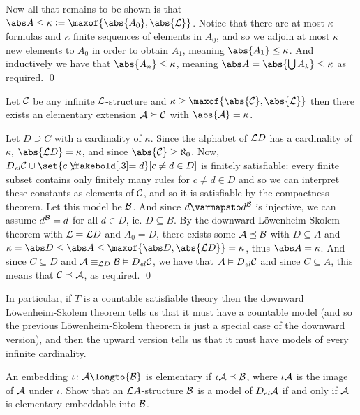Now all that remains to be shown is that $\abs A\leq\kappa\coloneqq\maxof{\abs{A_0},\abs{{\cal L}}}$.
Notice that there are at most $\kappa$ formulas and $\kappa$ finite sequences of elements in $A_0$, and so we adjoin at most $\kappa$ new elements to $A_0$ in order to obtain $A_1$, meaning
$\abs{A_1}\leq\kappa$.
And inductively we have that $\abs{A_n}\leq\kappa$, meaning $\abs A=\abs{\bigcup A_k}\leq\kappa$ as required.
\qed

\bthrm[title=Upward L\"owenheim-Skolem Theorem, name=uplowskol]

    Let ${\cal C}$ be any infinite ${\cal L}$-structure and $\kappa\geq\maxof{\abs{{\cal C}},\abs{{\cal L}}}$ then there exists an elementary extension ${\cal A}\succeq{\cal C}$ with $\abs{{\cal A}}=\kappa$.

\ethrm

Let $D\supseteq C$ with a cardinality of $\kappa$.
Since the alphabet of ${\cal L}D$ has a cardinality of $\kappa$, $\abs{{\cal L}D}=\kappa$, and since $\abs{{\cal C}}\geq\aleph_0$.
Now, $D_{\it el}{\cal C}\cup\set{c\neqb d}[c\neq d\in D]$ is finitely satisfiable: every finite subset contains only finitely many rules for $c\neq d\in D$ and so we can interpret these constants as
elements of ${\cal C}$, and so it is satisfiable by the compactness theorem.
Let this model be ${\cal B}$.
And since $d\varmapsto d^{\cal B}$ is injective, we can assume $d^{\cal B}=d$ for all $d\in D$, ie. $D\subseteq B$.
By the downward L\"owenheim-Skolem theorem with ${\cal L}={\cal L}D$ and $A_0=D$, there exists some ${\cal A}\preceq{\cal B}$ with $D\subseteq A$ and
$\kappa=\abs D\leq\abs A\leq\maxof{\abs D,\abs{{\cal L}D}}=\kappa$, thus $\abs A=\kappa$.
And since $C\subseteq D$ and ${\cal A}\equiv_{{\cal L}D}{\cal B}\vDash D_{\it el}{\cal C}$, we have that ${\cal A}\vDash D_{\it el}{\cal C}$ and since $C\subseteq A$, this means that
${\cal C}\preceq{\cal A}$, as required.
\qed

In particular, if $T$ is a countable satisfiable theory then the downward L\"owenheim-Skolem theorem tells us that it must have a countable model (and so the previous L\"owenheim-Skolem theorem is just a
special case of the downward version), and then the upward version tells us that it must have models of every infinite cardinality.

\bexerc

    An embedding $\iota\colon{\cal A}\longto{\cal B}$ is {\emphcolor elementary} if $\iota{\cal A}\preceq{\cal B}$, where $\iota{\cal A}$ is the image of ${\cal A}$ under $\iota$.
    Show that an ${\cal L}A$-structure ${\cal B}$ is a model of $D_{\it el}{\cal A}$ if and only if ${\cal A}$ is elementary embeddable into ${\cal B}$.

